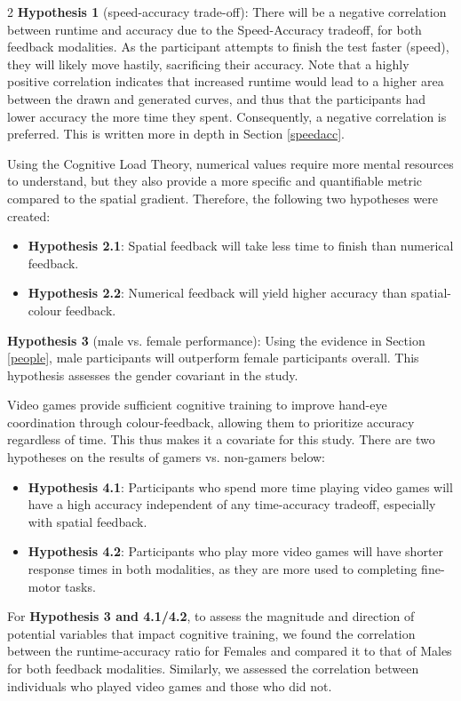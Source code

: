 \documentclass[a4paper,12pt]{article}
\begin{document}
\begin{multicols}{2}
\textbf{Hypothesis 1} (speed-accuracy trade-off): There will be a negative correlation between runtime and accuracy due to the Speed-Accuracy tradeoff, for both feedback modalities. As the participant attempts to finish the test faster (speed), they will likely move hastily, sacrificing their accuracy. Note that a highly positive correlation indicates that increased runtime would lead to a higher area between the drawn and generated curves, and thus that the participants had lower accuracy the more time they spent. Consequently, a negative correlation is preferred. This is written more in depth in Section \ref{speedacc}. 

Using the Cognitive Load Theory\cite{castroalonso_2019_the}, numerical values require more mental resources to understand, but they also provide a more specific and quantifiable metric compared to the spatial gradient. Therefore, the following two hypotheses were created:
\begin{itemize}
    \item \textbf{Hypothesis 2.1}: Spatial feedback will take less time to finish than numerical feedback. 
    \item \textbf{Hypothesis 2.2}: Numerical feedback will yield higher accuracy than spatial-colour feedback. 
\end{itemize}

\textbf{Hypothesis 3} (male vs. female performance): Using the evidence in Section \ref{people}, male participants will outperform female participants overall. This hypothesis assesses the gender covariant in the study. 

Video games provide sufficient cognitive training to improve hand-eye coordination \cite{videogames}  through colour-feedback, allowing them to prioritize accuracy regardless of time. This thus makes it a covariate for this study. There are two hypotheses on the results of gamers vs. non-gamers below:
\begin{itemize}
    \item \textbf{Hypothesis 4.1}: Participants who spend more time playing video games will have a high accuracy independent of any time-accuracy tradeoff, especially with spatial feedback. 
    \item \textbf{Hypothesis 4.2}: Participants who play more video games will have shorter response times in both modalities, as they are more used to completing fine-motor tasks.
\end{itemize}

For \textbf{Hypothesis 3 and 4.1/4.2}, to assess the magnitude and direction of potential variables that impact cognitive training, we found the correlation between the runtime-accuracy ratio for Females and compared it to that of Males for both feedback modalities. Similarly, we assessed the correlation between individuals who played video games and those who did not.


\end{multicols}
\end{document}

